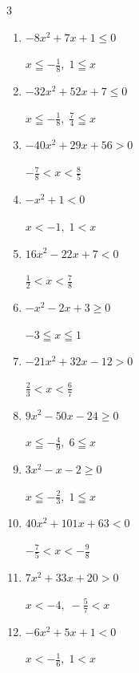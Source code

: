 \begin{multicols}{3}
\begin{enumerate}
        $\displaystyle x < -3 , \; -1 < x$

  \item $-8x^{2}+7x+1\leq 0$

        $\displaystyle x \leqq -\frac{1}{8} , \; 1 \leqq x$

  \item $-32x^{2}+52x+7\leq 0$

        $\displaystyle x \leqq -\frac{1}{8} , \; \frac{7}{4} \leqq x$

\columnbreak %

  \item $-40x^{2}+29x+56>0$

        $\displaystyle -\frac{7}{8} < x < \frac{8}{5}$

  \item $-x^{2}+1<0$

        $\displaystyle x < -1 , \; 1 < x$

  \item $16x^{2}-22x+7<0$

        $\displaystyle \frac{1}{2} < x < \frac{7}{8}$

  \item $-x^{2}-2x+3\geq 0$

        $\displaystyle -3 \leqq x \leqq 1$

  \item $-21x^{2}+32x-12>0$

        $\displaystyle \frac{2}{3} < x < \frac{6}{7}$

  \item $9x^{2}-50x-24\geq 0$

        $\displaystyle x \leqq -\frac{4}{9} , \; 6 \leqq x$

  \item $3x^{2}-x-2\geq 0$

        $\displaystyle x \leqq -\frac{2}{3} , \; 1 \leqq x$

  \item $40x^{2}+101x+63<0$

        $\displaystyle -\frac{7}{5} < x < -\frac{9}{8}$

  \item $7x^{2}+33x+20>0$

        $\displaystyle x < -4 , \; -\frac{5}{7} < x$

  \item $-6x^{2}+5x+1<0$

        $\displaystyle x < -\frac{1}{6} , \; 1 < x$

\columnbreak %


\end{enumerate}
\end{multicols}
